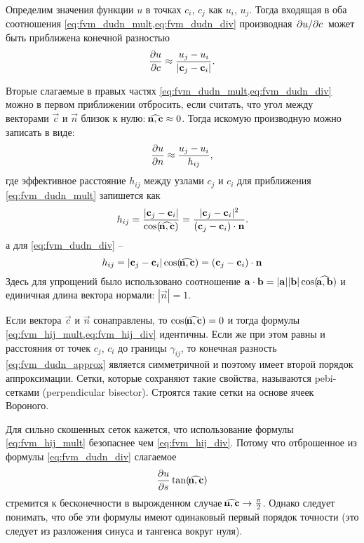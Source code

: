 Определим значения функции $u$ в точках $c_i$, $c_j$ как $u_i$, $u_j$.
Тогда входящая в оба соотношения \cref{eq:fvm_dudn_mult,eq:fvm_dudn_div} производная $\left.\partial u\middle/\partial c\right.$ 
может быть приближена конечной разностью
$$
\frac{\partial u}{\partial c} \approx \frac{u_j - u_i}{|\boldsymbol{\rm c}_j - \boldsymbol{\rm c}_i|}.
$$

Вторые слагаемые в правых частях \cref{eq:fvm_dudn_mult,eq:fvm_dudn_div} можно в первом приближении отбросить, если считать, что угол между векторами $\vec c$ и $\vec n$ 
близок к нулю: $\vecangle{n}{c} \approx 0$.
Тогда искомую производную можно записать в виде:
\begin{equation}
\label{eq:fvm_dudn_approx}
\frac{\partial u}{\partial n} \approx \frac{u_j - u_i}{h_{ij}},
\end{equation}
где эффективное расстояние $h_{ij}$ между узлами $c_j$ и $c_i$ для приближения \cref{eq:fvm_dudn_mult} запишется как
\begin{equation}
\label{eq:fvm_hij_mult}
h_{ij} = \frac{|\vec c_j - \vec c_i|}{\cos(\vecangle{n}{c})} = \frac{|\vec c_j - \vec c_i|^2}{(\vec c_j - \vec c_i)\cdot \vec n}.
\end{equation}
а для \cref{eq:fvm_dudn_div} --
\begin{equation}
\label{eq:fvm_hij_div}
h_{ij} = |\vec c_j - \vec c_i|\cos(\vecangle{n}{c}) = (\vec c_j - \vec c_i)\cdot \vec n
\end{equation}
Здесь для упрощений было использовано соотношение $\vec a \cdot \vec b = |\vec a||\vec b|\cos(\vecangle{a}{b})$
и единичная длина вектора нормали: $|\vec n| = 1$.

Если вектора $\vec c$ и $\vec n$ сонаправлены, то $\cos(\vecangle{n}{c})=0$ и тогда
формулы \cref{eq:fvm_hij_mult,eq:fvm_hij_div} идентичны.
Если же при этом равны и расстояния от точек $c_j$, $c_i$ до
границы $\gamma_{ij}$, то конечная разность \cref{eq:fvm_dudn_approx}
является симметричной и поэтому имеет второй порядок аппроксимации.
Сетки, которые сохраняют такие свойства, называются
pebi-сетками (perpendicular bisector). Строятся такие сетки на основе ячеек Вороного.


Для сильно скошенных сеток кажется, что использование
формулы \cref{eq:fvm_hij_mult} безопаснее чем \cref{eq:fvm_hij_div}.
Потому что отброшенное из формулы \cref{eq:fvm_dudn_div} 
слагаемое 
$$
\dfr{u}{s}\tan(\vecangle{n}{c})
$$
стремится к бесконечности в вырожденном случае $\vecangle{n}{c} \to \tfrac{\pi}{2}$.
Однако следует понимать, что обе эти формулы
имеют одинаковый первый порядок точности
(это следует из разложения синуса и тангенса вокруг нуля).


